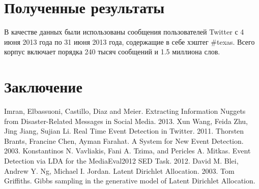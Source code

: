 \documentclass[12pt, a4paper]{article}
\begin{document}
  \section{Полученные результаты}
  В качестве данных были использованы сообщения пользователей Twitter с 4 июня 2013 года по 31 июня 2013 года, содержащие в себе хэштег \#texas. Всего корпус включает порядка 240 тысяч сообщений и 1.5 миллиона слов. 
  \section{Заключение}

\begin{thebibliography}{9}
	Imran, Elbassuoni, Castillo, Diaz and Meier.
	Extracting Information Nuggets from Disaster-Related Messages in Social Media.
	2013.
	Xun Wang, Feida Zhu, Jing Jiang, Sujian Li.
	Real Time Event Detection in Twitter.
	2011.
	Thorsten Brants, Francine Chen, Ayman Farahat.
	A System for New Event Detection.
	2003.
	Konstantinos N. Vavliakis, Fani A. Tzima, and Pericles A. Mitkas.	
	Event Detection via LDA for the MediaEval2012 SED Task.
	2012.
	David M. Blei, Andrew Y. Ng, Michael I. Jordan.
	Latent Dirichlet Allocation.
	2003.
	Tom Griffiths.
	Gibbs sampling in the generative model of Latent Dirichlet Allocation.
\end{thebibliography}
  
\end{document}
